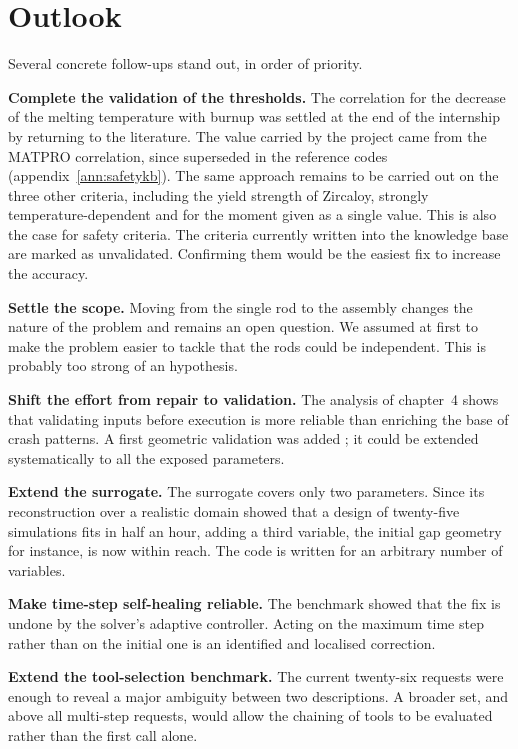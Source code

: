 \documentclass[12pt,a4paper]{report}
\begin{document}
\section*{Outlook}

Several concrete follow-ups stand out, in order of priority.

\textbf{Complete the validation of the thresholds.} The correlation for the
decrease of the melting temperature with burnup was settled at the end of the
internship by returning to the literature. The value carried by the project came
from the MATPRO correlation, since superseded in the reference codes
(appendix~\ref{ann:safetykb}). The same approach remains to be carried out on the
three other criteria, including the yield strength of Zircaloy, strongly
temperature-dependent and for the moment given as a single value. This is also the case for safety criteria. The criteria currently written into the
knowledge base are marked as unvalidated. Confirming them would be the easiest fix to increase the accuracy.

\textbf{Settle the scope.} Moving from the single rod to the assembly changes the
nature of the problem and remains an open question. We assumed at first to make the problem easier to tackle that the rods could be independent. This is probably too strong of an hypothesis.

\textbf{Shift the effort from repair to validation.} The analysis of chapter~4
shows that validating inputs before execution is more reliable than enriching the
base of crash patterns. A first geometric validation was added ; it could be
extended systematically to all the exposed parameters.

\textbf{Extend the surrogate.} The surrogate covers only two parameters. Since
its reconstruction over a realistic domain showed that a design of twenty-five
simulations fits in half an hour, adding a third variable, the initial gap
geometry for instance, is now within reach. The code is written for an
arbitrary number of variables.

\textbf{Make time-step self-healing reliable.} The benchmark showed that the fix
is undone by the solver's adaptive controller. Acting on the maximum time step
rather than on the initial one is an identified and localised correction.


\textbf{Extend the tool-selection benchmark.} The current twenty-six requests
were enough to reveal a major ambiguity between two descriptions. A broader set,
and above all multi-step requests, would allow the chaining of tools to be
evaluated rather than the first call alone.
\end{document}
